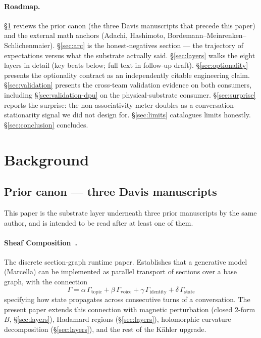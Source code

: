 \documentclass[11pt,letterpaper]{article}
\begin{document}
\paragraph{Roadmap.}
\S\ref{sec:background} reviews the prior canon (the three Davis
manuscripts that precede this paper) and the external math anchors
(Adachi, Hashimoto, Bordemann--Meinrenken--Schlichenmaier).
\S\ref{sec:arc} is the honest-negatives section --- the trajectory of
expectations versus what the substrate actually said.
\S\ref{sec:layers} walks the eight layers in detail (key beats below;
full text in follow-up draft). \S\ref{sec:optionality} presents the
optionality contract as an independently citable engineering claim.
\S\ref{sec:validation} presents the cross-team validation evidence on
both consumers, including \S\ref{sec:validation-dpu} on the
physical-substrate consumer. \S\ref{sec:surprise} reports the
surprise: the non-associativity meter doubles as a
conversation-stationarity signal we did not design for.
\S\ref{sec:limits} catalogues limits honestly.
\S\ref{sec:conclusion} concludes.


\section{Background}
\label{sec:background}

\subsection{Prior canon --- three Davis manuscripts}
\label{sec:prior-canon}

This paper is the substrate layer underneath three prior manuscripts
by the same author, and is intended to be read after at least one of
them.

\paragraph{Sheaf Composition~\cite{davis2026sheafcomposition}.}
The discrete section-graph runtime paper. Establishes that a
generative model (Marcella) can be implemented as parallel transport
of sections over a base graph, with the connection
\[
\Gamma = \alpha\,\Gamma_{\text{topic}} + \beta\,\Gamma_{\text{voice}}
       + \gamma\,\Gamma_{\text{identity}} + \delta\,\Gamma_{\text{state}}
\]
specifying how state propagates across consecutive turns of a
conversation. The present paper extends this connection with magnetic
perturbation (closed 2-form $B$, \S\ref{sec:layers}), Hadamard regions
(\S\ref{sec:layers}), holomorphic curvature decomposition
(\S\ref{sec:layers}), and the rest of the K\"ahler upgrade.
\end{document}

